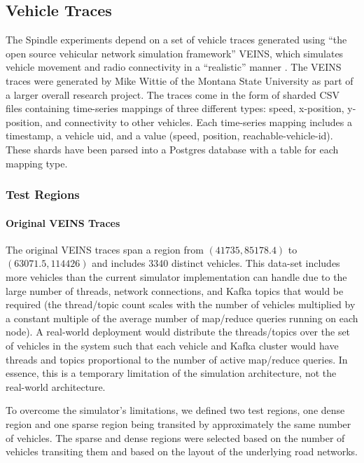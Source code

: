 \documentclass{thesis}
\begin{document}
\subsection{Vehicle Traces}
   The Spindle experiments depend on a set of vehicle traces 
   generated using ``the open source vehicular network simulation framework'' VEINS, which simulates
   vehicle movement and radio connectivity in a ``realistic'' manner \cite{veins}. The VEINS traces
   were generated by Mike Wittie of the Montana State University as part of a larger overall research
   project. 
   The traces come in the form of sharded CSV files containing time-series mappings of three different types:
   speed, x-position, y-position, and connectivity to other vehicles. Each time-series mapping includes
   a timestamp, a vehicle uid, and a value (speed, position, reachable-vehicle-id). 
   These shards have been parsed into a Postgres database with a table for each mapping type.
\subsubsection{Test Regions} %
    \paragraph{Original VEINS Traces}
        The original VEINS traces span a region from $(41735, 85178.4)$ to $(63071.5, 114426)$ and includes 3340 distinct
        vehicles. This data-set includes more vehicles than the current simulator implementation can handle due to the large
        number of threads, network connections, and Kafka topics that would be required (the thread/topic count scales with the
        number of vehicles multiplied by a constant multiple of the average number of map/reduce queries running on each node).
        A real-world deployment would distribute the threads/topics over the set of vehicles in the system such that each
        vehicle and Kafka cluster would have threads and topics proportional to the number of active map/reduce queries.
        In essence, this is a temporary limitation of the simulation architecture, not the real-world architecture.

        To overcome the simulator's limitations, we defined two test regions, one dense region and one sparse region
        being transited by approximately the same number of vehicles. The sparse and dense regions were selected based
        on the number of vehicles transiting them and based on the layout of the underlying road networks.
\end{document}
